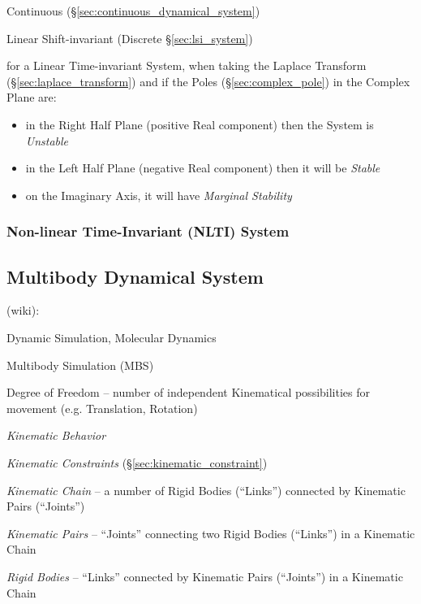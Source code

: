 Continuous (\S\ref{sec:continuous_dynamical_system})

\fist Linear Shift-invariant (Discrete \S\ref{sec:lsi_system})

for a Linear Time-invariant System, when taking the Laplace Transform
(\S\ref{sec:laplace_transform}) and if the Poles (\S\ref{sec:complex_pole}) in
the Complex Plane are:
\begin{itemize}
  \item in the Right Half Plane (positive Real component) then the System is
    \emph{Unstable}
  \item in the Left Half Plane (negative Real component) then it will be
    \emph{Stable}
  \item on the Imaginary Axis, it will have \emph{Marginal Stability}
\end{itemize}



\subsubsection{Non-linear Time-Invariant (NLTI) System}\label{sec:nlti_system}



\subsection{Multibody Dynamical System}\label{sec:multibody_system}

(wiki):

Dynamic Simulation, Molecular Dynamics

Multibody Simulation (MBS)

Degree of Freedom -- number of independent Kinematical possibilities for
movement (e.g. Translation, Rotation)

\emph{Kinematic Behavior}

\emph{Kinematic Constraints} (\S\ref{sec:kinematic_constraint})

\emph{Kinematic Chain} -- a number of Rigid Bodies (``Links'') connected by
Kinematic Pairs (``Joints'')

\emph{Kinematic Pairs} -- ``Joints'' connecting two Rigid Bodies (``Links'') in
a Kinematic Chain

\emph{Rigid Bodies} -- ``Links'' connected by Kinematic Pairs (``Joints'') in a
Kinematic Chain

